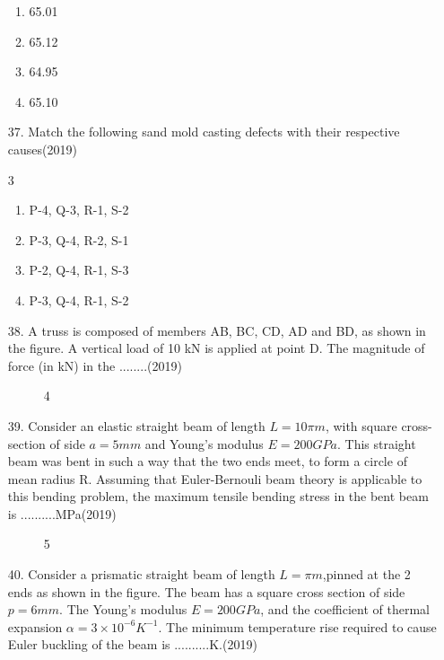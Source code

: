 \documentclass[journal]{IEEEtran}
\begin{document}
\begin{enumerate}
\begin{enumerate}[label=(\Alph*)]
        \item 65.01
        \item 65.12
        \item 64.95
        \item 65.10
    \end{enumerate}
    \item[37.] Match the following sand mold casting defects with their respective causes\hfill (2019)
    \begin{table}[!ht]
        \centering
        \caption{3}
    \end{table}
    \begin{enumerate}[label=(\Alph*)]
        \item P-4, Q-3, R-1, S-2
        \item P-3, Q-4, R-2, S-1
        \item P-2, Q-4, R-1, S-3
        \item P-3, Q-4, R-1, S-2
    \end{enumerate}
    \item[38.] A truss is composed of members AB, BC, CD, AD and BD, as shown in the figure. A vertical load of 10 kN is applied at point D. The magnitude of force (in kN) in the ........\hfill (2019)
    \begin{figure}[!ht]
        \centering
        \caption{4}
    \end{figure}
    \item[39.] Consider an elastic straight beam of length $L=10\pi m$, with square cross-section of side $a=5mm$ and Young's modulus $E = 200 GPa$. This straight beam was bent in such a way that the two ends meet, to form a circle of mean radius R. Assuming that Euler-Bernouli beam theory is applicable to this bending problem, the maximum tensile bending stress in the bent beam is ..........MPa\hfill (2019)
    \begin{figure}[!ht]
        \centering
        \caption{5}
    \end{figure}
    \item[40.] Consider a prismatic straight beam of length $L= \pi m$,pinned at the 2 ends as shown in the figure. The beam has a square cross section of side $p = 6mm$. The Young's modulus $E = 200GPa$, and the coefficient of thermal expansion $\alpha = 3\times 10^{-6}K^{-1}$. The minimum temperature rise required to cause Euler buckling of the beam is ..........K.\hfill (2019)

\end{enumerate}
\end{document}
